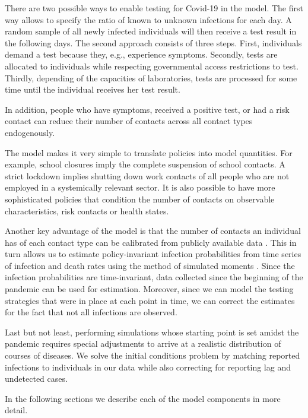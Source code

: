There are two possible ways to enable testing for Covid-19 in the model. The first way
allows to specify the ratio of known to unknown infections for each day. A random sample
of all newly infected individuals will then receive a test result in the following days.
The second approach consists of three steps. First, individuals demand a test because
they, e.g., experience symptoms. Secondly, tests are allocated to individuals while
respecting governmental access restrictions to test. Thirdly, depending of the
capacities of laboratories, tests are processed for some time until the individual
receives her test result.

In addition, people who have symptoms, received a positive test, or had a risk contact
can reduce their number of contacts across all contact types endogenously.

The model makes it very simple to translate policies into model quantities. For example,
school closures imply the complete suspension of school contacts. A strict lockdown
implies shutting down work contacts of all people who are not employed in a systemically
relevant sector. It is also possible to have more sophisticated policies that condition
the number of contacts on observable characteristics, risk contacts or health states.

Another key advantage of the model is that the number of contacts an individual has of
each contact type can be calibrated from publicly available data \citep{Mossong2008}.
This in turn allows us to estimate policy-invariant infection probabilities from time
series of infection and death rates using the method of simulated moments
\citep{McFadden1989}. Since the infection probabilities are time-invariant, data
collected since the beginning of the pandemic can be used for estimation. Moreover,
since we can model the testing strategies that were in place at each point in time, we
can correct the estimates for the fact that not all infections are observed.

Last but not least, performing simulations whose starting point is set amidst the
pandemic requires special adjustments to arrive at a realistic distribution of courses
of diseases. We solve the initial conditions problem by matching reported infections to
individuals in our data while also correcting for reporting lag and undetected cases.

In the following sections we describe each of the model components in more detail.
